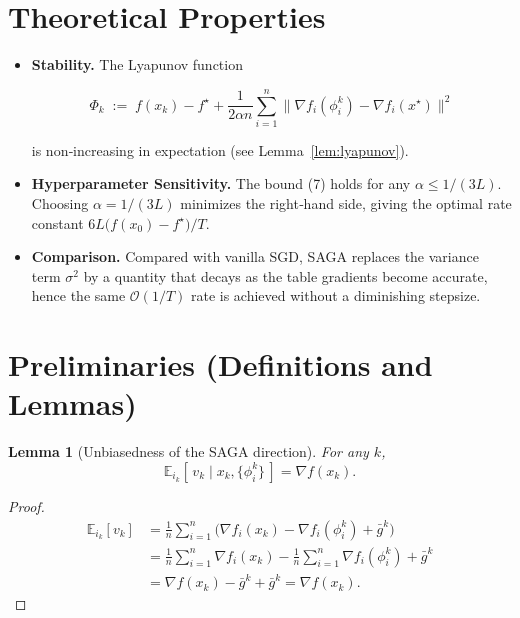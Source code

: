 \documentclass{article}
\newtheorem{lemma}{Lemma}
\begin{document}
\section*{Theoretical Properties}
\begin{itemize}
\item \textbf{Stability.} The Lyapunov function  

\[
\Phi_k \;:=\; f(x_k)-f^{\star}
      +\frac{1}{2\alpha n}\sum_{i=1}^{n}\big\|\nabla f_i(\phi_i^k)-\nabla f_i(x^{\star})\big\|^{2}
\tag{8}
\]

is non‑increasing in expectation (see Lemma~\ref{lem:lyapunov}).
\item \textbf{Hyperparameter Sensitivity.} The bound (7) holds for any
$\alpha\le 1/(3L)$. Choosing $\alpha=1/(3L)$ minimizes the right‑hand side,
giving the optimal rate constant $6L\big(f(x_0)-f^{\star}\big)/T$.
\item \textbf{Comparison.} Compared with vanilla SGD, SAGA replaces the
variance term $\sigma^{2}$ by a quantity that decays as the table
gradients become accurate, hence the same $\mathcal{O}(1/T)$ rate is achieved
without a diminishing stepsize.
\end{itemize}

\section*{Preliminaries (Definitions and Lemmas)}
\begin{lemma}[Unbiasedness of the SAGA direction]\label{lem:unbiased}
For any $k$,
\[
\mathbb{E}_{i_k}[\,v_k\mid x_k,\{\phi_i^k\}\,]
      =\nabla f(x_k).
\tag{9}
\]
\end{lemma}
\begin{proof}
\[
\begin{aligned}
\mathbb{E}_{i_k}[v_k]
&=\frac1n\sum_{i=1}^{n}\bigl(\nabla f_i(x_k)-\nabla f_i(\phi_i^k)+\bar g^k\bigr)\\
&=\frac1n\sum_{i=1}^{n}\nabla f_i(x_k)-\frac1n\sum_{i=1}^{n}\nabla f_i(\phi_i^k)+\bar g^k\\
&=\nabla f(x_k)-\bar g^k+\bar g^k
 =\nabla f(x_k).
\end{aligned}
\]
\end{proof}
\end{document}
